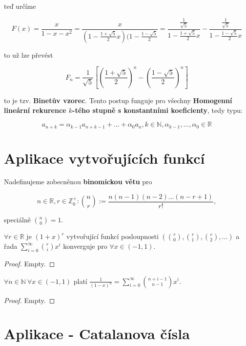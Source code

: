 teď určíme

$$
F(x) = \frac{x}{1-x-x^2} = \frac{x}{(1 - \frac{1 + \sqrt{5}}{2}x)(1 - \frac{1 - \sqrt{5}}{2}} = \frac{\frac{1}{\sqrt{5}}}{1 - \frac{1 + \sqrt{5}}{2}x} - \frac{\frac{1}{\sqrt{5}}}{1 - \frac{1 - \sqrt{5}}{2}x}
$$

to už lze převést

$$
F_n = \frac{1}{\sqrt{5}}\left[ \left( \frac{1+\sqrt{5}}{2} \right)^n - \left( \frac{1-\sqrt{5}}{2} \right)^n \right]
$$

to je tzv. \textbf{Binetův vzorec}. Tento postup funguje pro všechny \textbf{Homogenní lineární rekurence $k$-tého stupně s konstantními koeficienty}, tedy typu:

$$
a_{n+k} = \alpha_{k-1}a_{n+k-1} + \dots + \alpha_0 a_n, k \in \mathbb{N}, \alpha_{k-1}, \dots, \alpha_0 \in \mathbb{R}
$$

\section{Aplikace vytvořujících funkcí}

Nadefinujeme zobecněnou \textbf{binomickou větu} pro

$$
n \in \mathbb{R}, r \in \mathbb{Z}_{0}^{+}: \binom{n}{r}:= \frac{n(n-1)(n-2)\dots(n-r+1)}{r!},
$$

speciálně $\binom{n}{0}=1$.

\begin{veta}
	$\forall r \in \mathbb{R}$ je $(1+x)^r$ vytvořující funkcí posloupnosti $\left( \binom{r}{0}, \binom{r}{1}, \binom{r}{2}, \dots \right)$ a řada $\sum_{i=0}^{\infty}\binom{r}{i}x^{i}$ konverguje pro $\forall x \in (-1, 1)$.	
\end{veta}

\begin{proof}
	Empty.
\end{proof}

\begin{dusl}
	$\forall n \in \mathbb{N} \ \forall x \in (-1,1)$ platí $\frac{1}{(1-x)^{n}}=\sum_{i=0}^{\infty}\binom{n+i-1}{n-1} x^{i}$.
\end{dusl}

\begin{proof}
	Empty.
\end{proof}

\section{Aplikace - Catalanova čísla}

